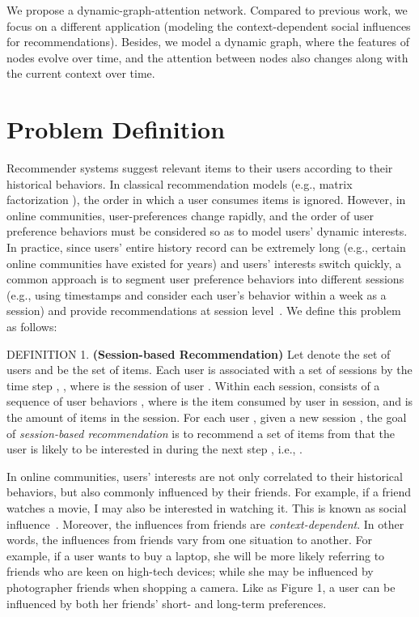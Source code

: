 \documentclass[sigconf]{acmart}
\begin{document}
We propose a dynamic-graph-attention network. Compared to previous work, we focus on a different application (modeling the context-dependent social influences for recommendations). Besides, we model a dynamic graph, where the features of nodes evolve over time, and the attention between nodes also changes along with the current context over time. 
 \section{Problem Definition}

Recommender systems suggest relevant items to their users according to their historical behaviors. In classical recommendation models (e.g., matrix factorization \cite{mnih2008probabilistic}), the order in which a user consumes items is ignored. However, in online communities, user-preferences change rapidly, and the order of user preference behaviors must be considered so as to model users' dynamic interests. In practice, since users' entire history record can be extremely long (e.g., certain online communities have existed for years) and users' interests switch quickly, a common approach is to segment user preference behaviors into different sessions (e.g., using timestamps and consider each user's behavior within a week as a session) and provide recommendations at session level~\cite{hidasi2016session}. We define this problem as follows:

\textup{DEFINITION 1.} \textbf{(Session-based Recommendation)} Let  denote the set of users and  be the set of items. 
Each user  is associated with a set of sessions by the time step , , 
where 
is the  session of user . Within each session,  consists of a sequence of user behaviors , where  is the  item consumed by user  in  session, and  is the amount of items in the session. For each user , given a new session , the goal of \emph{session-based recommendation} is to recommend a set of items from  that the user is likely to be interested in during the next step , i.e., .

In online communities, users' interests are not only correlated to their historical behaviors, but also commonly influenced by their friends.
For example, if a friend watches a movie, I may also be interested in watching it. This is known as social influence~\cite{tang2009social}. Moreover, the influences from friends are \emph{context-dependent}. In other words, the influences from friends vary from one situation to another. For example, if a user wants to buy a laptop, she will be more likely referring to friends who are keen on high-tech devices; while she may be influenced by photographer friends when shopping a camera. Like as Figure 1, a user can be influenced by both her friends' short- and long-term preferences. 
\end{document}
